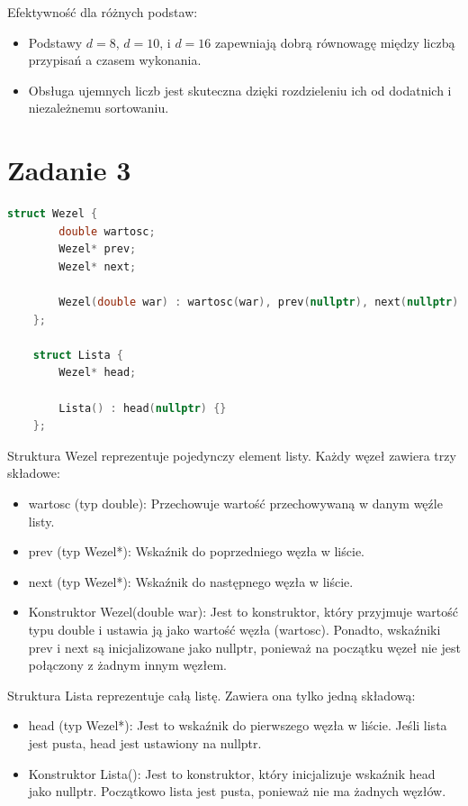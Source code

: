 \documentclass{article}
\begin{document}
			Efektywność dla różnych podstaw:
			
			\begin{itemize}
				\item Podstawy \( d = 8 \), \( d = 10 \), i \( d = 16 \) zapewniają dobrą równowagę między liczbą przypisań a czasem wykonania.
				\item Obsługa ujemnych liczb jest skuteczna dzięki rozdzieleniu ich od dodatnich i niezależnemu sortowaniu.
			\end{itemize}
			
			\newpage
			\section*{Zadanie 3}
			
			\begin{lstlisting}[language=C++, tabsize=3] 
	struct Wezel {
		double wartosc;     
		Wezel* prev;  
		Wezel* next; 
		
		Wezel(double war) : wartosc(war), prev(nullptr), next(nullptr) {} 
	};
	
	struct Lista {
		Wezel* head;
		
		Lista() : head(nullptr) {} 
	};
			\end{lstlisting}
			
			Struktura Wezel reprezentuje pojedynczy element listy. Każdy węzeł zawiera trzy składowe:
			\begin{itemize}
				\item wartosc (typ double):	Przechowuje wartość przechowywaną w danym węźle listy. 
				\item prev (typ Wezel*): Wskaźnik do poprzedniego węzła w liście.
				\item next (typ Wezel*): Wskaźnik do następnego węzła w liście.
				\item Konstruktor Wezel(double war): Jest to konstruktor, który przyjmuje wartość typu double i ustawia ją jako wartość węzła (wartosc). Ponadto, wskaźniki prev i next są inicjalizowane jako nullptr, ponieważ na początku węzeł nie jest połączony z żadnym innym węzłem.
			\end{itemize}
			
			Struktura Lista reprezentuje całą listę. Zawiera ona tylko jedną składową:
			\begin{itemize}
				\item head (typ Wezel*): Jest to wskaźnik do pierwszego węzła w liście. Jeśli lista jest pusta, head jest ustawiony na nullptr. 
				
				\item Konstruktor Lista(): Jest to konstruktor, który inicjalizuje wskaźnik head jako nullptr. Początkowo lista jest pusta, ponieważ nie ma żadnych węzłów.
			\end{itemize}
			
\end{document}
